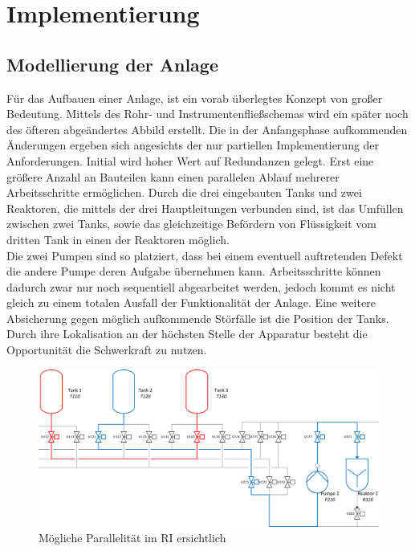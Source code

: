 \chapter{Implementierung} \label{chapter:thevetestcase}
\section{Modellierung der Anlage}
Für das Aufbauen einer Anlage, ist ein vorab überlegtes Konzept von großer Bedeutung. Mittels des Rohr- und Instrumentenfließschemas wird ein später noch des öfteren abgeändertes Abbild erstellt. Die in der Anfangsphase aufkommenden Änderungen ergeben sich angesichts der nur partiellen Implementierung der Anforderungen. Initial wird hoher Wert auf Redundanzen gelegt. Erst eine größere Anzahl an Bauteilen kann einen parallelen Ablauf mehrerer Arbeitsschritte ermöglichen. Durch die drei eingebauten Tanks und zwei Reaktoren, die mittels der drei Hauptleitungen verbunden sind, ist das Umfüllen zwischen zwei Tanks, sowie das gleichzeitige Befördern von Flüssigkeit vom dritten Tank in einen der Reaktoren möglich.\\

Die zwei Pumpen sind so platziert, dass bei einem eventuell auftretenden Defekt die andere Pumpe deren Aufgabe übernehmen kann. Arbeitsschritte können dadurch zwar nur noch sequentiell abgearbeitet werden, jedoch kommt es nicht gleich zu einem totalen Ausfall der Funktionalität der Anlage. Eine weitere Absicherung gegen möglich aufkommende Störfälle ist die Position der Tanks. Durch ihre Lokalisation an der höchsten Stelle der Apparatur besteht die Opportunität die Schwerkraft zu nutzen.\\

\begin{figure}[h!]
  \centering
  \includegraphics[width=1\textwidth]{graphics/implementation/RI_Impl_cropped.jpg}
  \caption{Mögliche Parallelität im RI ersichtlich}
\end{figure}

